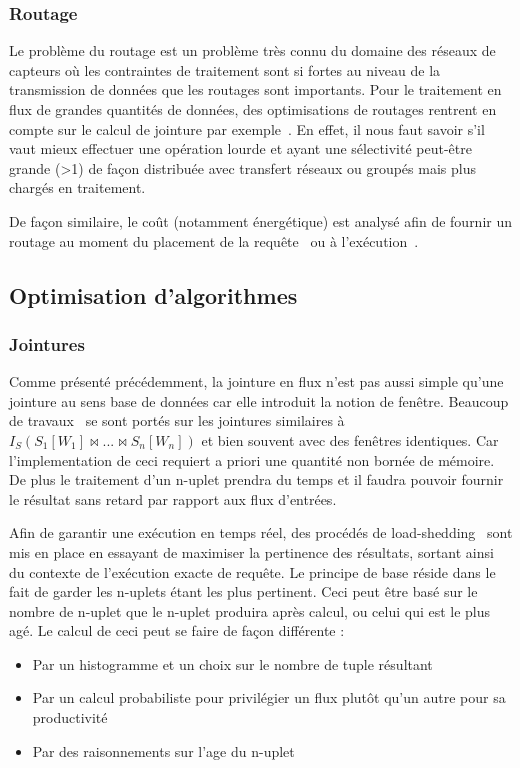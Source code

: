 \subsubsection{Routage}
Le problème du routage est un problème très connu du domaine des réseaux de capteurs où les contraintes de traitement sont si fortes au niveau de la transmission de données que les routages sont importants. Pour le traitement en flux de grandes quantités de données, des optimisations de routages rentrent en compte sur le calcul de jointure par exemple~\cite{Zhou:pmjoin}. En effet, il nous faut savoir s'il vaut mieux effectuer une opération lourde et ayant une sélectivité peut-être grande (>1) de façon distribuée avec transfert réseaux ou groupés mais plus chargés en traitement. 

De façon similaire, le coût (notamment énergétique) est analysé afin de fournir un routage au moment du placement de la requête~\cite{Galpin:snee} ou à l'exécution~\cite{Madden:tinydb}.

\subsection{Optimisation d'algorithmes}

\subsubsection{Jointures}
Comme présenté précédemment, la jointure en flux n'est pas aussi simple qu'une jointure au sens base de données car elle introduit la notion de fenêtre. Beaucoup de travaux~\cite{Han:join, Srivastava:join, Law:join} se sont portés sur les jointures similaires à $I_S (S_1[W_1] \Join ... \Join S_n[W_n])$ et bien souvent avec des fenêtres identiques. Car l'implementation de ceci requiert a priori une quantité non bornée de mémoire. De plus le traitement d'un n-uplet prendra du temps et il faudra pouvoir fournir le résultat sans retard par rapport aux flux d'entrées. 

Afin de garantir une exécution en temps réel, des procédés de load-shedding~\cite{Tatbul:load-shedding} sont mis en place en essayant de maximiser la pertinence des résultats, sortant ainsi du contexte de l'exécution exacte de requête. Le principe de base réside dans le fait de garder les n-uplets étant les plus pertinent. Ceci peut être basé sur le nombre de n-uplet que le n-uplet produira après calcul, ou celui qui est le plus agé. Le calcul de ceci peut se faire de façon différente :
\begin{itemize}
 \item Par un histogramme et un choix sur le nombre de tuple résultant~\cite{Han:join}
 \item Par un calcul probabiliste pour privilégier un flux plutôt qu'un autre pour sa productivité~\cite{Han:join}
 \item Par des raisonnements sur l'age du n-uplet~\cite{Srivastava:join}
\end{itemize}

